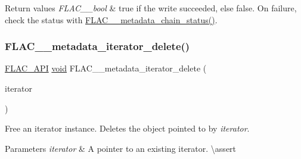 \begin{DoxyRetVals}{Return values}
{\em F\+L\+A\+C\+\_\+\+\_\+bool} & {\ttfamily true} if the write succeeded, else {\ttfamily false}. On failure, check the status with \mbox{\hyperlink{group__flac__metadata__level2_ga3d030e216a6517f23372bb76f0639127}{F\+L\+A\+C\+\_\+\+\_\+metadata\+\_\+chain\+\_\+status()}}. \\
\hline
\end{DoxyRetVals}
\mbox{\label{group__flac__metadata__level2_ga1af713d0ae3f7b761579b4fac64f0a9e}} 
\subsubsection{\texorpdfstring{FLAC\_\_metadata\_iterator\_delete()}{FLAC\_\_metadata\_iterator\_delete()}}
{\footnotesize\ttfamily \mbox{\hyperlink{group__flac__export_ga56ca07df8a23310707732b1c0007d6f5}{F\+L\+A\+C\+\_\+\+A\+PI}} \mbox{\hyperlink{_s_d_l__opengles2__gl2ext_8h_ae5d8fa23ad07c48bb609509eae494c95}{void}} F\+L\+A\+C\+\_\+\+\_\+metadata\+\_\+iterator\+\_\+delete (\begin{DoxyParamCaption}\item[{\mbox{\hyperlink{group__flac__metadata__level2_ga9f3e135a07cdef7e51597646aa7b89b2}{F\+L\+A\+C\+\_\+\+\_\+\+Metadata\+\_\+\+Iterator}} $\ast$}]{iterator }\end{DoxyParamCaption})}

Free an iterator instance. Deletes the object pointed to by {\itshape iterator}.


\begin{DoxyParams}{Parameters}
{\em iterator} & A pointer to an existing iterator. \textbackslash{}assert 
\begin{DoxyCode}{1}
\end{DoxyCode}
 \\
\hline
\end{DoxyParams}
\mbox{\label{group__flac__metadata__level2_ga18fdaae4986696dc000cae6357810f7b}} 
